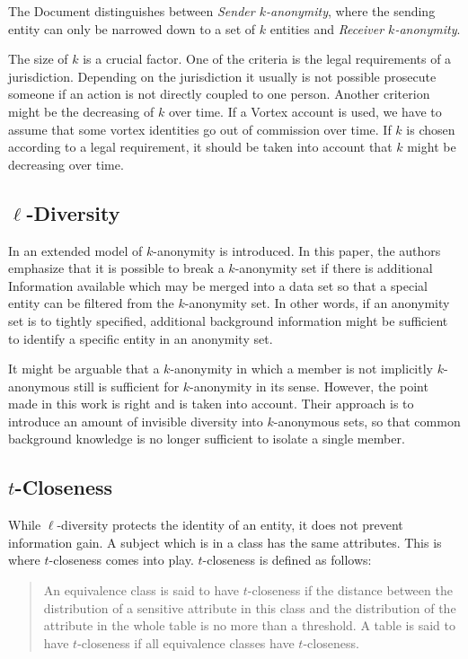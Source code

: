 The Document distinguishes between \textit{Sender $k$-anonymity}, where the sending entity can only be narrowed down to a set of $k$ entities and \textit{Receiver $k$-anonymity}. 

The size of $k$ is a crucial factor. One of the criteria is the legal requirements of a jurisdiction. Depending on the jurisdiction it usually is not possible prosecute someone if an action is not directly coupled to one person. Another criterion might be the decreasing of $k$ over time. If a Vortex account is used, we have to assume that some vortex identities go out of commission over time. If $k$ is chosen according to a legal requirement, it should be taken into account that $k$ might be decreasing over time.

\subsection{$\ell$-Diversity}
In \cite{machanavajjhala2007diversity} an extended model of $k$-anonymity is introduced. In this paper, the authors emphasize that it is possible to break a $k$-anonymity set if there is additional Information available which may be merged into a data set so that a special entity can be filtered from the $k$-anonymity set. In other words, if an anonymity set is to tightly specified, additional background information might be sufficient to identify a specific entity in an anonymity set.

It might be arguable that a $k$-anonymity in which a member is not implicitly $k$-anonymous still is sufficient for $k$-anonymity in its sense. However, the point made in this work is right and is taken into account. Their approach is to introduce an amount of invisible diversity into $k$-anonymous sets, so that common background knowledge is no longer sufficient to isolate a single member.

\subsection{$t$-Closeness}
While $\ell$-diversity protects the identity of an entity, it does not prevent information gain. A subject which is in a class has the same attributes. This is where $t$-closeness\cite{li2007t} comes into play. $t$-closeness is defined as follows:

\begin{quote}
	An equivalence class is said to have $t$-closeness if the distance between the distribution of a sensitive attribute in this class and the distribution of the attribute in the whole table is no more than a threshold. A table is said to have $t$-closeness if all equivalence classes have $t$-closeness.
\end{quote}


